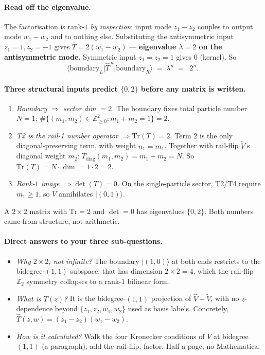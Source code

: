 \documentclass[11pt,a4paper]{article}
\begin{document}
\paragraph{Read off the eigenvalue.} The factorisation is rank-$1$ \emph{by inspection}: input mode $z_1-z_2$ couples to output mode $w_1-w_2$ and to nothing else. Substituting the antisymmetric input $z_1=1,z_2=-1$ gives $\widehat T = 2(w_1-w_2)$ --- \textbf{eigenvalue $\lambda=2$ on the antisymmetric mode.} Symmetric input $z_1=z_2=1$ gives $0$ (kernel). So
\[
\big\langle \text{boundary}_L \big| \widehat T^{\,n} \big| \text{boundary}_R \big\rangle
\;=\; \lambda^n \;=\; \boxed{\;2^n.\;}
\]

\paragraph{Three structural inputs predict $\{0,2\}$ before any matrix is written.}
\begin{enumerate}[leftmargin=2em,itemsep=1pt]
  \item \emph{Boundary $\Rightarrow$ sector dim $=2$.} The boundary fixes total particle number $N=1$; $\#\{(m_1,m_2)\in\mathbb Z_{\ge 0}^2: m_1+m_2=1\}=2$.
  \item \emph{T2 is the rail-1 number operator $\Rightarrow \mathrm{Tr}(T)=2$.} Term 2 is the only diagonal-preserving term, with weight $n_1=m_1$. Together with rail-flip $\widetilde V$'s diagonal weight $m_2$: $T_{\text{diag}}(m_1,m_2) = m_1+m_2 = N$. So $\mathrm{Tr}(T) = N\cdot \dim = 1\cdot 2 = 2$.
  \item \emph{Rank-$1$ image $\Rightarrow \det(T)=0$.} On the single-particle sector, T2/T4 require $m_1\ge 1$, so $V$ annihilates $|(0,1)\rangle$.
\end{enumerate}
A $2{\times}2$ matrix with $\mathrm{Tr}=2$ and $\det=0$ has eigenvalues $\{0,2\}$. Both numbers came from structure, not arithmetic.

\paragraph{Direct answers to your three sub-questions.}
\begin{itemize}[leftmargin=2em,itemsep=2pt]
  \item \emph{Why $2{\times}2$, not infinite?} The boundary $|(1,0)\rangle$ at both ends restricts to the bidegree-$(1,1)$ subspace; that has dimension $2{\times}2=4$, which the rail-flip $\mathbb Z_2$ symmetry collapses to a rank-$1$ bilinear form.
  \item \emph{What is $T(z)$?} It is the bidegree-$(1,1)$ projection of $\widehat V + \widetilde V$, with no $z$-dependence beyond $\{z_1,z_2,w_1,w_2\}$ used as basis labels. Concretely, $\widehat T(z,w) = (z_1-z_2)(w_1-w_2)$.
  \item \emph{How is it calculated?} Walk the four Kronecker conditions of $V$ at bidegree $(1,1)$ (a paragraph), add the rail-flip, factor. Half a page, no Mathematica.
\end{itemize}
\end{document}
